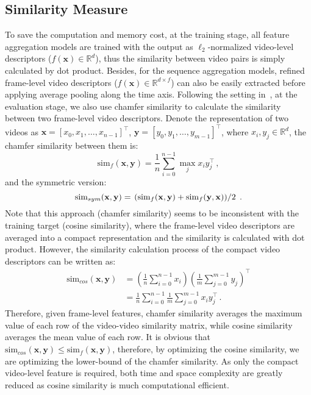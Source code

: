 \documentclass[10pt,twocolumn,letterpaper]{article}
\begin{document}
\subsection{Similarity Measure} \label{subsection:simcal}
To save the computation and memory cost, at the training stage, all feature aggregation models are trained with the output as $\ell_2$-normalized video-level descriptors ($f(\mathbf{x}) \in \mathbb{R}^{d}$), thus the similarity between video pairs is simply calculated by dot product. Besides, for the sequence aggregation models, refined frame-level video descriptors ($f(\mathbf{x}) \in \mathbb{R}^{d\times f}$) can also be easily extracted before applying average pooling along the time axis. Following the setting in~\cite{kordopatis2019visil}, at the evaluation stage, we also use chamfer similarity to calculate the similarity between two frame-level video descriptors. Denote the representation of two videos as $\mathbf{x} = [x_0, x_1, \dots, x_{n-1}]^{\top}$, $\mathbf{y} = [y_0, y_1, \dots, y_{m-1}]^{\top}$, where $x_i, y_j \in \mathbb{R}^d$, the chamfer similarity between them is:
\begin{equation} \label{eq:chamfer}
    \text{sim}_{f}(\mathbf{x}, \mathbf{y}) = \frac{1}{n}\sum_{i=0}^{n-1}\max_{j}{x_{i}y_{j}^{\top}} \,,
\end{equation}
and the symmetric version:
\begin{equation} \label{eq:sym}
    \text{sim}_{sym}(\mathbf{x}, \mathbf{y}) = \left.\left( \text{sim}_{f}(\mathbf{x}, \mathbf{y}) + \text{sim}_{f}(\mathbf{y}, \mathbf{x}) \right) \middle/ 2\right. \,.
\end{equation}
Note that this approach (chamfer similarity) seems to be inconsistent with the training target (cosine similarity), where the frame-level video descriptors are averaged into a compact representation and the similarity is calculated with dot product. However, the similarity calculation process of the compact video descriptors can be written as:
{\small
\begin{equation} \label{eq:cos}
\begin{aligned}
    \text{sim}_{cos}(\mathbf{x}, \mathbf{y}) &= \left(\frac{1}{n}\sum_{i=0}^{n-1}x_{i}\right)\left(\frac{1}{m}\sum_{j=0}^{m-1}y_{j}\right)^{\top} \\
    &= \frac{1}{n}\sum_{i=0}^{n-1}\frac{1}{m}\sum_{j=0}^{m-1}x_{i}y_{j}^{\top} \,.
\end{aligned}
\end{equation}
}
Therefore, given frame-level features, chamfer similarity averages the maximum value of each row of the video-video similarity matrix, while cosine similarity averages the mean value of each row. It is obvious that $\text{sim}_{cos}(\mathbf{x}, \mathbf{y}) \leq \text{sim}_{f}(\mathbf{x}, \mathbf{y})$, therefore, by optimizing the cosine similarity, we are optimizing the lower-bound of the chamfer similarity. As only the compact video-level feature is required, both time and space complexity are greatly reduced as cosine similarity is much computational efficient.
\end{document}
